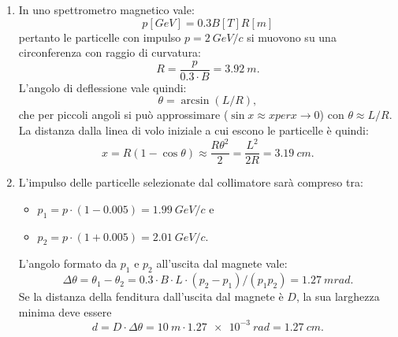 \begin{Answer}
  \begin{enumerate}
  \item In uno spettrometro magnetico vale:
    \[
    p[GeV] = 0.3B[T] R[m]
    \]
    pertanto le particelle con impulso $p = \SI{2}{GeV/c}$ si muovono su una circonferenza con raggio di curvatura:
    \[
    R = \frac{p}{0.3 \cdot B} = \SI{3.92}{m}.
    \]
    L’angolo di deflessione vale quindi:
    \[
    \theta = \arcsin (L/R),
    \]
    che per piccoli angoli si pu\`o approssimare ($\sin x \approx x per x \to 0$) con $\theta \approx L/R$. La distanza dalla linea di volo iniziale a cui escono le particelle \`e quindi:
    \[
    x = R(1-\cos\theta) \approx \frac{R\theta^2}{2} = \frac{L^2}{2R} = \SI{3.19}{cm}.
    \]
    
  \item L’impulso delle particelle selezionate dal collimatore sar\`a compreso tra:
    \begin{itemize}
    \item $p_1 = p\cdot(1-0.005) = \SI{1.99}{GeV/c}$ e
    \item $p_2 = p\cdot(1+0.005) = \SI{2.01}{GeV/c}$.
    \end{itemize}
    L’angolo formato da $p_1$ e $p_2$ all’uscita dal magnete vale:
    \[
    \Delta \theta = \theta_1 - \theta_2 = 0.3 \cdot B\cdot L\cdot (p_2 - p_1)/(p_1p_2) = \SI{1.27}{mrad}.
    \]
    Se la distanza della fenditura dall’uscita dal magnete \`e $D$, la sua larghezza minima deve essere
    \[
    d = D \cdot \Delta\theta = \SI{10}{m}\cdot\SI{1.27e-3}{rad} = \SI{1.27}{cm}.
    \]


\end{enumerate}
\end{Answer}
